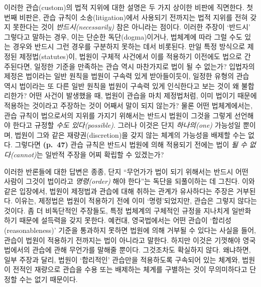 \documentclass[12pt, oneside]{book}  %
\begin{document}
이러한 관습(custom)의 법적 지위에 대한 설명은 두 가지 상이한 비판에
직면한다. 첫 번째 비판은, 관습 규칙이 소송(litigation)에서 사용되기
전까지는 법적 지위를 전혀 갖지 못한다는 것이 \emph{반드시(necessarily)}
참은 아니라는 점이다. 이러한 주장이 `반드시' 그렇다고 말하는 경우, 이는
단순한 독단(dogma)이거나, 법체계에 따라 그럴 수도 있는 경우와 반드시
그런 경우를 구분하지 못하는 데서 비롯된다. 만일 특정 방식으로 제정된
제정법(statutes)이, 법원이 구체적 사건에서 이를 적용하기 이전에도 법으로
간주된다면, 일정한 기준을 만족하는 관습 역시 마찬가지로 법이 될 수
없는가? 입법자의 제정은 법이라는 일반 원칙을 법원이 구속력 있게
받아들이듯이, 일정한 유형의 관습 역시 법이라는 또 다른 일반 원칙을
법원이 구속력 있게 인식한다고 보는 것이 왜 불합리한가? 어떤 사건이
발생했을 때, 법원이 관습을 마치 제정법처럼, 이미 법이기 때문에 적용하는
것이라고 주장하는 것이 어째서 말이 되지 않는가? 물론 어떤 법체계에서는,
관습 규칙이 법으로서의 지위를 가지기 위해서는 반드시 법원이 그것을
그렇게 선언해야 한다고 규정할 \emph{수도 있다(possible)}. 그러나 이것은
단지 \emph{하나의(one)} 가능성일 뿐이며, 법원이 그와 같은
재량권(discretion)을 갖지 않는 체계의 가능성을 배제할 수는 없다.
그렇다면 \textbf{(p.~47)} 관습 규칙은 반드시 법원에 의해 적용되기 전에는
법이 \emph{될 수 없다(cannot)}는 일반적 주장을 어찌 확립할 수 있겠는가?

이러한 반론들에 대한 답변은 종종, 단지 ``무언가가 법이 되기 위해서는
반드시 어떤 사람이 그것이 법이라고 \emph{명령(order)} 해야 한다''는
독단을 되풀이하는 데 그친다. 이와 같은 입장에서, 법원이 제정법과 관습에
대해 취하는 관계가 유사하다는 주장은 거부된다. 이유는, 제정법은 법원이
적용하기 전에 이미 `명령'되었지만, 관습은 그렇지 않다는 것이다. 좀 더
비독단적인 주장들도, 특정 법체계의 구체적인 규정을 지나치게 일반화하기
때문에 설득력을 갖지 못한다. 예컨대, 영국법에서는 어떤 관습이
`합리성(reasonableness)' 기준을 통과하지 못하면 법원에 의해 거부될 수
있다는 사실을 들어, 관습이 법원이 적용하기 전까지는 법이 아니라고
말한다. 하지만 이것은 기껏해야 영국법에서의 관습에 관해 무언가를 말해줄
뿐이다. 그것조차도 확실하지 않다. 왜냐하면, 일부 주장과 달리, 법원이
`합리적인' 관습만을 적용하도록 구속되어 있는 체계와, 법원이 전적인
재량으로 관습을 수용 또는 배제하는 체계를 구별하는 것이 무의미하다고
단정할 수는 없기 때문이다.
\end{document}
